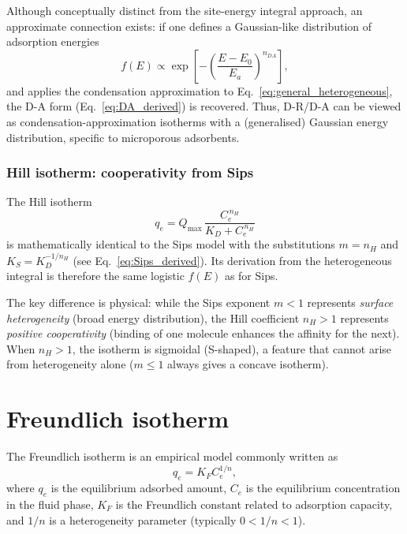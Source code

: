 	Although conceptually distinct from the site-energy integral
	approach, an approximate connection exists: if one defines a
	Gaussian-like distribution of adsorption energies
	\begin{equation}
		f(E) \propto \exp\!\left[-\left(\frac{E - E_0}{E_a}\right)^{n_{DA}}
		\right],
	\end{equation}
	and applies the condensation approximation to
	Eq.~\eqref{eq:general_heterogeneous}, the D-A form
	(Eq.~\eqref{eq:DA_derived}) is recovered. Thus, D-R/D-A can be
	viewed as condensation-approximation isotherms with a
	(generalised) Gaussian energy distribution, specific to
	microporous adsorbents.

	\subsubsection{Hill isotherm: cooperativity from Sips}

	The Hill isotherm
	\begin{equation}
		q_e = Q_{\max}\,\frac{C_e^{\,n_H}}{K_D + C_e^{\,n_H}}
	\end{equation}
	is mathematically identical to the Sips model with the
	substitutions $m = n_H$ and $K_S = K_D^{-1/n_H}$ (see
	Eq.~\eqref{eq:Sips_derived}). Its derivation from the
	heterogeneous integral is therefore the same logistic
	$f(E)$ as for Sips.

	The key difference is physical: while the Sips exponent $m < 1$
	represents \emph{surface heterogeneity} (broad energy
	distribution), the Hill coefficient $n_H > 1$ represents
	\emph{positive cooperativity} (binding of one molecule enhances
	the affinity for the next). When $n_H > 1$, the isotherm is
	sigmoidal (S-shaped), a feature that cannot arise from
	heterogeneity alone ($m \leq 1$ always gives a concave
	isotherm).

	\section{Freundlich isotherm}
	
	The Freundlich isotherm is an empirical model commonly written as
	\begin{equation}
		q_e = K_F C_e^{1/n},
		\label{eq:Freundlich}
	\end{equation}
	where \(q_e\) is the equilibrium adsorbed amount, \(C_e\) is the
	equilibrium concentration in the fluid phase, \(K_F\) is the
	Freundlich constant related to adsorption capacity, and \(1/n\)
	is a heterogeneity parameter (typically \(0 < 1/n < 1\)).
	
